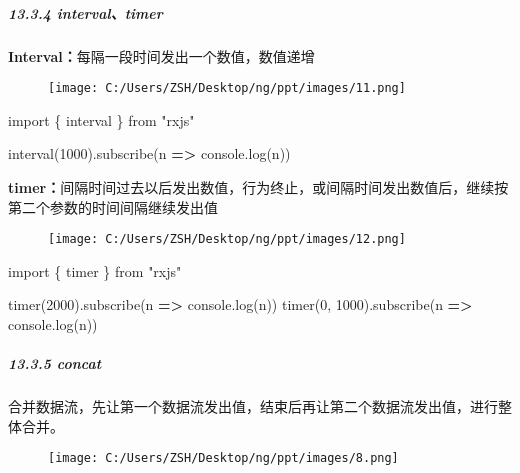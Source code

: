 \documentclass[
]{article}
\newenvironment{Shaded}{}{}
\newcommand{\BuiltInTok}[1]{#1}
\newcommand{\DecValTok}[1]{\textcolor[rgb]{0.25,0.63,0.44}{#1}}
\newcommand{\FunctionTok}[1]{\textcolor[rgb]{0.02,0.16,0.49}{#1}}
\newcommand{\ImportTok}[1]{#1}
\newcommand{\KeywordTok}[1]{\textcolor[rgb]{0.00,0.44,0.13}{\textbf{#1}}}
\newcommand{\NormalTok}[1]{#1}
\newcommand{\OperatorTok}[1]{\textcolor[rgb]{0.40,0.40,0.40}{#1}}
\newcommand{\StringTok}[1]{\textcolor[rgb]{0.25,0.44,0.63}{#1}}
\begin{document}
\hypertarget{1334-intervaltimer}{%
\subparagraph{13.3.4 interval、timer}\label{1334-intervaltimer}}

\textbf{Interval：}每隔一段时间发出一个数值，数值递增

\begin{figure}
\centering
\texttt{[image: C:/Users/ZSH/Desktop/ng/ppt/images/11.png]}
\caption{}
\end{figure}

\begin{Shaded}
\begin{Highlighting}[]
\ImportTok{import}\NormalTok{ \{ interval \} }\ImportTok{from} \StringTok{"rxjs"}

\FunctionTok{interval}\NormalTok{(}\DecValTok{1000}\NormalTok{)}\OperatorTok{.}\FunctionTok{subscribe}\NormalTok{(n }\KeywordTok{=\textgreater{}} \BuiltInTok{console}\OperatorTok{.}\FunctionTok{log}\NormalTok{(n))}
\end{Highlighting}
\end{Shaded}

\textbf{timer：}间隔时间过去以后发出数值，行为终止，或间隔时间发出数值后，继续按第二个参数的时间间隔继续发出值

\begin{figure}
\centering
\texttt{[image: C:/Users/ZSH/Desktop/ng/ppt/images/12.png]}
\caption{}
\end{figure}

\begin{Shaded}
\begin{Highlighting}[]
\ImportTok{import}\NormalTok{ \{ timer \} }\ImportTok{from} \StringTok{"rxjs"}

\FunctionTok{timer}\NormalTok{(}\DecValTok{2000}\NormalTok{)}\OperatorTok{.}\FunctionTok{subscribe}\NormalTok{(n }\KeywordTok{=\textgreater{}} \BuiltInTok{console}\OperatorTok{.}\FunctionTok{log}\NormalTok{(n))}
\FunctionTok{timer}\NormalTok{(}\DecValTok{0}\OperatorTok{,} \DecValTok{1000}\NormalTok{)}\OperatorTok{.}\FunctionTok{subscribe}\NormalTok{(n }\KeywordTok{=\textgreater{}} \BuiltInTok{console}\OperatorTok{.}\FunctionTok{log}\NormalTok{(n))}
\end{Highlighting}
\end{Shaded}

\hypertarget{1335-concat}{%
\subparagraph{13.3.5 concat}\label{1335-concat}}

合并数据流，先让第一个数据流发出值，结束后再让第二个数据流发出值，进行整体合并。

\begin{figure}
\centering
\texttt{[image: C:/Users/ZSH/Desktop/ng/ppt/images/8.png]}
\caption{}
\end{figure}
\end{document}
